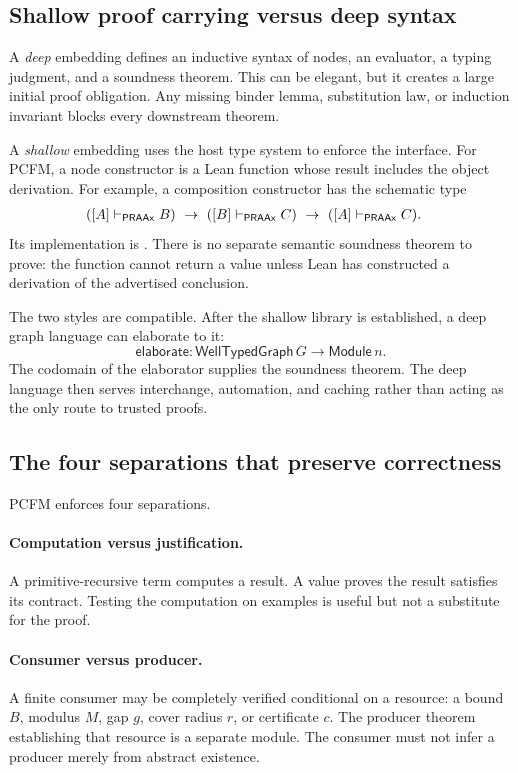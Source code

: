 \subsection{Shallow proof carrying versus deep syntax}

A \emph{deep} embedding defines an inductive syntax of nodes, an evaluator, a
typing judgment, and a soundness theorem.  This can be elegant, but it creates
a large initial proof obligation.  Any missing binder lemma, substitution law,
or induction invariant blocks every downstream theorem.

A \emph{shallow} embedding uses the host type system to enforce the interface.
For PCFM, a node constructor is a Lean function whose result includes the
object derivation.  For example, a composition constructor has the schematic
type
\[
\begin{aligned}
&([A]\vdash_{\mathsf{PRAAx}}B)\ \to\
  ([B]\vdash_{\mathsf{PRAAx}}C)\ \to\
  ([A]\vdash_{\mathsf{PRAAx}}C).
\end{aligned}
\]
Its implementation is .  There is no separate semantic
soundness theorem to prove: the function cannot return a value unless Lean has
constructed a derivation of the advertised conclusion.

The two styles are compatible.  After the shallow library is established, a
deep graph language can elaborate to it:
\[
   \mathsf{elaborate} :
   \mathsf{WellTypedGraph}\,G
   \longrightarrow
   \mathsf{Module}\,n .
\]
The codomain of the elaborator supplies the soundness theorem.  The deep
language then serves interchange, automation, and caching rather than acting
as the only route to trusted proofs.

\subsection{The four separations that preserve correctness}

PCFM enforces four separations.

\paragraph{Computation versus justification.}
A primitive-recursive term computes a result.  A  value proves
the result satisfies its contract.  Testing the computation on examples is
useful but not a substitute for the proof.

\paragraph{Consumer versus producer.}
A finite consumer may be completely verified conditional on a resource:
a bound \(B\), modulus \(M\), gap \(g\), cover radius \(r\), or certificate
\(c\).  The producer theorem establishing that resource is a separate module.
The consumer must not infer a producer merely from abstract existence.

